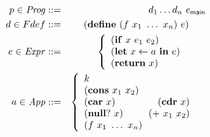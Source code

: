 
\small
\begin{eqnarray*}
   p \in \mathit{Prog} & ::= & d_1 \ldots d_n \,\, e_\mainpgm \\
    d \in Fdef & ::= & (\DEFINE\,\, (f\,\, 
    x_1 \,\, \ldots \,\, x_n)\,\,
    e) 
    \hspace{1.7em} \mbox{} \\
e \in \mathit{Expr} & ::= &
\left\{\begin{array}{lll}
       (\SIF\,\, x\,\, e_1\,\, e_2) && \mbox{} \\  
       (\LET\,\, x \leftarrow a\,\, \IN\,\, e) && \mbox{} \\
       (\RETURN\,\, x) && \mbox{}
    \end{array}\right. \\
a \in \mathit{App} & ::= &
\left\{\begin{array}{lrl}
       k && \mbox{}\\
       (\CONS\,\, {x_1}\,\, {x_2}) && \mbox{} \\ 
       (\CAR\,\, {x)} &  (\CDR\,\, {x)} & \mbox{} \\ 
       (\NULLQ\,\, {x}) & (\PRIM\,\, {x_1}\,\, {x_2}) & \mbox{} \\ 
       \multicolumn{2}{l}{(f\,\,{ x_1}\,\,\ldots\,\, {x_n})} 
            & \mbox{} 
    \end{array}\right.
\end{eqnarray*}


